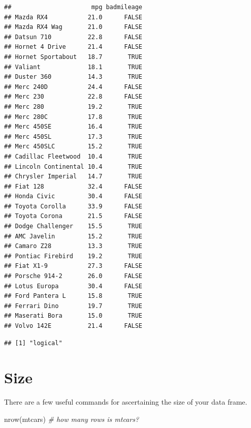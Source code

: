 \documentclass[
]{book}
\newenvironment{Shaded}{\begin{snugshade}}{\end{snugshade}}
\newcommand{\CommentTok}[1]{\textcolor[rgb]{0.56,0.35,0.01}{\textit{#1}}}
\newcommand{\FunctionTok}[1]{\textcolor[rgb]{0.00,0.00,0.00}{#1}}
\newcommand{\NormalTok}[1]{#1}
\newcommand{\SpecialCharTok}[1]{\textcolor[rgb]{0.00,0.00,0.00}{#1}}
\begin{document}
\begin{verbatim}
##                      mpg badmileage
## Mazda RX4           21.0      FALSE
## Mazda RX4 Wag       21.0      FALSE
## Datsun 710          22.8      FALSE
## Hornet 4 Drive      21.4      FALSE
## Hornet Sportabout   18.7       TRUE
## Valiant             18.1       TRUE
## Duster 360          14.3       TRUE
## Merc 240D           24.4      FALSE
## Merc 230            22.8      FALSE
## Merc 280            19.2       TRUE
## Merc 280C           17.8       TRUE
## Merc 450SE          16.4       TRUE
## Merc 450SL          17.3       TRUE
## Merc 450SLC         15.2       TRUE
## Cadillac Fleetwood  10.4       TRUE
## Lincoln Continental 10.4       TRUE
## Chrysler Imperial   14.7       TRUE
## Fiat 128            32.4      FALSE
## Honda Civic         30.4      FALSE
## Toyota Corolla      33.9      FALSE
## Toyota Corona       21.5      FALSE
## Dodge Challenger    15.5       TRUE
## AMC Javelin         15.2       TRUE
## Camaro Z28          13.3       TRUE
## Pontiac Firebird    19.2       TRUE
## Fiat X1-9           27.3      FALSE
## Porsche 914-2       26.0      FALSE
## Lotus Europa        30.4      FALSE
## Ford Pantera L      15.8       TRUE
## Ferrari Dino        19.7       TRUE
## Maserati Bora       15.0       TRUE
## Volvo 142E          21.4      FALSE
\end{verbatim}

\begin{Shaded}
\end{Shaded}

\begin{verbatim}
## [1] "logical"
\end{verbatim}

\hypertarget{size}{%
\section{Size}\label{size}}

There are a few useful commands for ascertaining the size of your data frame.

\begin{Shaded}
\begin{Highlighting}[]
\FunctionTok{nrow}\NormalTok{(mtcars) }\CommentTok{\# how many rows is mtcars?}
\end{Highlighting}
\end{Shaded}
\end{document}
